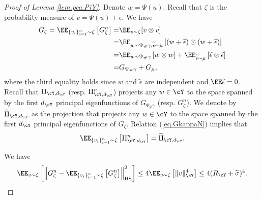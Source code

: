 \documentclass[11pt]{article} %
\begin{document}
\begin{proof}[Proof of Lemma \ref{lem.pca.PiY}]
	Denote $w=\Psi(u)$. Recall that $\zeta$ is the probability measure of $v=\Psi(u)+\widetilde{\epsilon}$. We have %
	\begin{align}
		G_{\zeta}=\EE_{\{v_i\}_{i=1}^n\sim \zeta} \left[G_{\zeta}^n\right]=&\EE_{v\sim \zeta} [v\otimes v]\nonumber\\
		=&\EE_{w \sim \Psi_{\#}\gamma,\widetilde{\epsilon}\sim \mu} \left[(w+\widetilde{\epsilon})\otimes (w+\widetilde{\epsilon})\right] \nonumber\\
		=& \EE_{w\sim \Psi_{\#}\gamma} \left[w\otimes w\right] +\EE_{\widetilde{\epsilon}\sim \mu} \left[\widetilde{\epsilon}\otimes\widetilde{\epsilon}\right]\nonumber\\
		=&G_{\Psi_{\#}\gamma}+G_{\mu},
		\label{eq.GkappaN}
	\end{align}
	where the third equality holds since $w$ and $\widetilde{\epsilon}$ are independent and $\EE \widetilde{\epsilon}=0$. 
	Recall that $\Pi_{\cY,d_{\cY}}$ (resp. $\Pi_{\cY,d_{\cY}}^n$) projects any $w\in \cY$ to the space spanned by the first $d_{\cY}$ principal eigenfunctions of $G_{\Psi_{\#}\gamma}$ (resp. $G_{\zeta}^n$). We denote by $\widetilde{\Pi}_{\cY,d_{\cY}}$ as the projection that projects any $w\in \cY$ to the space spanned by the first $d_{\cY}$ principal eigenfunctions of $G_{\zeta}$. Relation (\ref{eq.GkappaN}) implies that 
	$$\EE_{\{v_i\}_{i=1}^n\sim \zeta} \left[\Pi_{\cY,d_{\cY}}^n\right]=\widetilde{\Pi}_{\cY,d_{\cY}}.$$
	
	We have
	$$
	\EE_{v \sim \zeta} \left[\left \|G_{\zeta}^n-\EE_{\{v_i\}_{i=1}^n\sim \zeta} \left[G_{\zeta}^n\right]\right\|_{\rm HS}^2\right] \leq 4\EE_{v\sim \zeta} \left[\|v\|_{\cY}^4\right]\leq 4(R_{\cY}+\widetilde{\sigma})^4.
	$$
	

\end{proof}
\end{document}
